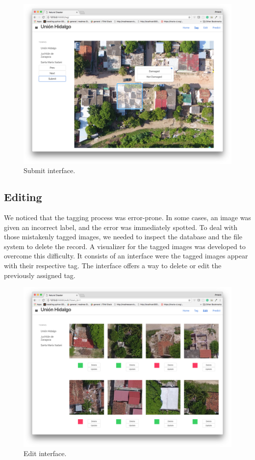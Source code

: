 \begin{figure}[!h]
  \centering
  \includegraphics[width=1\textwidth]{images/small-app-tag.png}
  \caption{Submit interface.}
  \label{fig:submit}
\end{figure}

\subsection{Editing}
We noticed that the tagging process was error-prone. In some cases, an image was given an incorrect label, and the error was immediately spotted. To deal with those mistakenly tagged images, we needed to inspect the database and the file system to delete the record. A visualizer for the tagged images was developed to overcome this difficulty. It consists of an interface were the tagged images appear with their respective tag. The interface offers a way to delete or edit the previously assigned tag.\\

\begin{figure}[!h]
  \centering
  \includegraphics[width=1\textwidth]{images/small-app-edit.png}
  \caption{Edit interface.}
  \label{fig:app-edit}
\end{figure}

